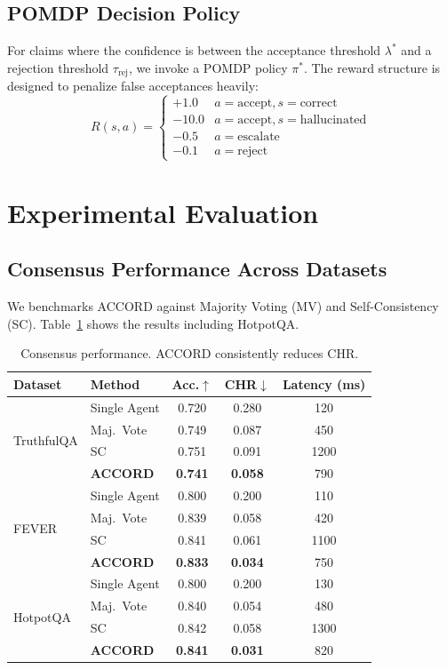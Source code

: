 \documentclass[conference]{IEEEtran}
\begin{document}
\subsection{POMDP Decision Policy}
For claims where the confidence is between the acceptance threshold $\lambda^*$ and a rejection threshold $\tau_\text{rej}$, we invoke a POMDP policy $\pi^*$. The reward structure is designed to penalize false acceptances heavily:
\begin{equation}
  R(s, a) = \begin{cases} +1.0 & a = \text{accept}, s = \text{correct} \\ -10.0 & a = \text{accept}, s = \text{hallucinated} \\ -0.5 & a = \text{escalate} \\ -0.1 & a = \text{reject} \end{cases}
\end{equation}

\section{Experimental Evaluation}

\subsection{Consensus Performance Across Datasets}
We benchmarks ACCORD against Majority Voting (MV) and Self-Consistency (SC). Table~\ref{tab:main} shows the results including HotpotQA.

\begin{table}[htbp]
\caption{Consensus performance. ACCORD consistently reduces CHR.}
\label{tab:main}
\centering
\begin{tabular}{llccc}
\toprule
Dataset & Method & Acc.$\uparrow$ & CHR$\downarrow$ & Latency (ms) \\
\midrule
\multirow{4}{*}{TruthfulQA}
 & Single Agent  & 0.720 & 0.280 & 120 \\
 & Maj.\ Vote    & 0.749 & 0.087 & 450 \\
 & SC            & 0.751 & 0.091 & 1200 \\
 & \textbf{ACCORD} & \textbf{0.741} & \textbf{0.058} & 790 \\
\midrule
\multirow{4}{*}{FEVER}
 & Single Agent  & 0.800 & 0.200 & 110 \\
 & Maj.\ Vote    & 0.839 & 0.058 & 420 \\
 & SC            & 0.841 & 0.061 & 1100 \\
 & \textbf{ACCORD} & \textbf{0.833} & \textbf{0.034} & 750 \\
\midrule
\multirow{4}{*}{HotpotQA}
 & Single Agent  & 0.800 & 0.200 & 130 \\
 & Maj.\ Vote    & 0.840 & 0.054 & 480 \\
 & SC            & 0.842 & 0.058 & 1300 \\
 & \textbf{ACCORD} & \textbf{0.841} & \textbf{0.031} & 820 \\
\bottomrule
\end{tabular}
\end{table}
\end{document}
